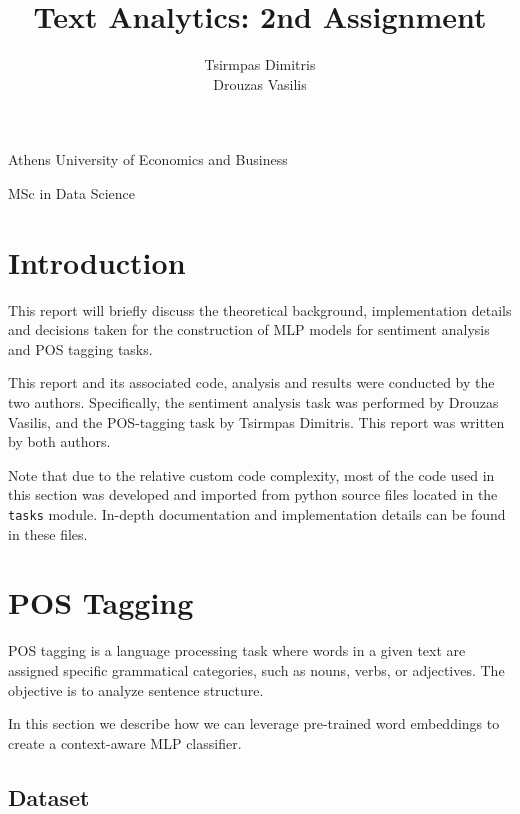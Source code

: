 \documentclass[10pt, a4paper]{article}
\title{\Huge Text Analytics: 2nd Assignment}
\author{\LARGE Tsirmpas Dimitris\\\LARGE Drouzas Vasilis}
\begin{document}
	
	\begin{titlepage}
		\maketitle
		\begin{center}
			
			\large Athens University of Economics and Business
			
			\large MSc in Data Science
			
		\end{center}
		
	\end{titlepage}
	
	\tableofcontents
	\newpage	
	
	\section{Introduction}
	
	This report will briefly discuss the theoretical background, implementation details and decisions taken for the construction of MLP models for sentiment analysis and POS tagging tasks.
	
	This report and its associated code, analysis and results were conducted by the two authors. Specifically, the sentiment analysis task was performed by Drouzas Vasilis, and the POS-tagging task by Tsirmpas Dimitris. This report was written by both authors.
	
	Note that due to the relative custom code complexity, most of the code used in this section was developed and imported from python source files located in the \texttt{tasks} module. In-depth documentation and implementation details can be found in these files. 
	
	
	\section{POS Tagging}
	
	POS tagging is a language processing task where words in a given text are assigned specific grammatical categories, such as nouns, verbs, or adjectives. The objective is to analyze sentence structure. 
	
	In this section we describe how we can leverage pre-trained word embeddings to create a context-aware MLP classifier.
	
	
	\subsection{Dataset}
	
\end{document}
